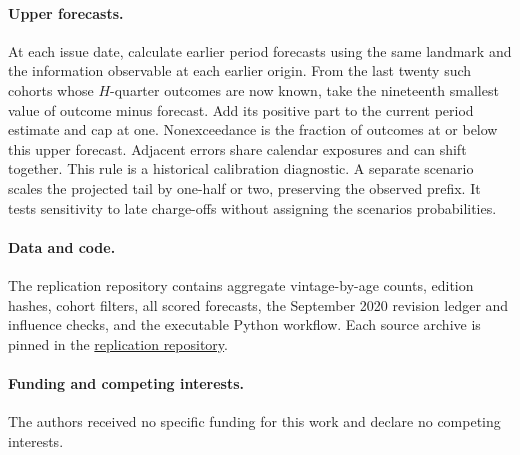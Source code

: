 \documentclass[11pt]{article}
\begin{document}
\paragraph{Upper forecasts.}
At each issue date, calculate earlier period forecasts using the same landmark and the information observable at each earlier origin. From the last twenty such cohorts whose $H$-quarter outcomes are now known, take the nineteenth smallest value of outcome minus forecast. Add its positive part to the current period estimate and cap at one. Nonexceedance is the fraction of outcomes at or below this upper forecast. Adjacent errors share calendar exposures and can shift together. This rule is a historical calibration diagnostic. A separate scenario scales the projected tail by one-half or two, preserving the observed prefix. It tests sensitivity to late charge-offs without assigning the scenarios probabilities.




\paragraph{Data and code.} The replication repository contains aggregate vintage-by-age counts, edition hashes, cohort filters, all scored forecasts, the September 2020 revision ledger and influence checks, and the executable Python workflow. Each source archive is pinned in the \href{https://github.com/fightforbelief/p16-credit-stress}{replication repository}.
\paragraph{Funding and competing interests.} The authors received no specific funding for this work and declare no competing interests.

\end{document}
